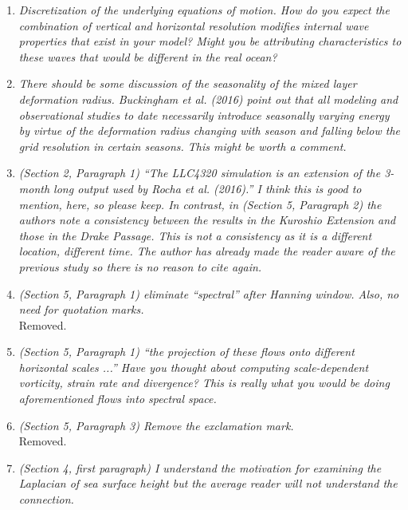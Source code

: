 \documentclass[11pt]{article}
\begin{document}
\begin{enumerate}
 \item {\it Discretization of the underlying equations of motion. How do you expect the
        combination of vertical and horizontal resolution modifies internal wave properties
        that exist in your model? Might you be attributing characteristics to these waves that
        would be different in the real ocean?}

\item {\it There should be some discussion of the seasonality of the mixed layer deformation
      radius. Buckingham et al. (2016) point out that all modeling and observational studies
      to date necessarily introduce seasonally varying energy by virtue of the deformation
      radius changing with season and falling below the grid resolution in certain seasons.
      This might be worth a comment.}

\item {\it (Section 2, Paragraph 1) ``The LLC4320 simulation is an extension of the 3-month
      long output used by Rocha et al. (2016).'' I think this is good to mention, here, so
      please keep. In contrast, in (Section 5, Paragraph 2) the authors note a consistency
      between the results in the Kuroshio Extension and those in the Drake Passage. This is
      not a consistency as it is a different location, different time. The author has already
      made the reader aware of the previous study so there is no reason to cite again.}

\item {\it (Section 5, Paragraph 1) eliminate ``spectral'' after Hanning window. Also, no need for
        quotation marks.}\\

        Removed.

\item {\it (Section 5, Paragraph 1) ``the projection of these flows onto different horizontal scales
            ...'' Have you thought about computing scale-dependent vorticity, strain rate and
            divergence? This is really what you would be doing
            aforementioned flows into spectral space.}

\item {\it (Section 5, Paragraph 3) Remove the exclamation mark.}\\

    Removed.

\item {\it (Section 4, first paragraph) I understand the motivation for examining the Laplacian of
      sea surface height but the average reader will not understand the connection.}


\end{enumerate}
\end{document}
